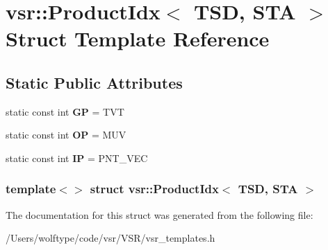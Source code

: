 \hypertarget{structvsr_1_1_product_idx_3_01_t_s_d_00_01_s_t_a_01_4}{\section{vsr\-:\-:Product\-Idx$<$ T\-S\-D, S\-T\-A $>$ Struct Template Reference}
\label{structvsr_1_1_product_idx_3_01_t_s_d_00_01_s_t_a_01_4}
}
\subsection*{Static Public Attributes}
\begin{DoxyCompactItemize}
\item 
\hypertarget{structvsr_1_1_product_idx_3_01_t_s_d_00_01_s_t_a_01_4_aebe5e7fd170de349619a1177c81133cb}{static const int {\bfseries G\-P} = T\-V\-T}\label{structvsr_1_1_product_idx_3_01_t_s_d_00_01_s_t_a_01_4_aebe5e7fd170de349619a1177c81133cb}

\item 
\hypertarget{structvsr_1_1_product_idx_3_01_t_s_d_00_01_s_t_a_01_4_ac8dee4caf30832a023a26c07c9be743d}{static const int {\bfseries O\-P} = M\-U\-V}\label{structvsr_1_1_product_idx_3_01_t_s_d_00_01_s_t_a_01_4_ac8dee4caf30832a023a26c07c9be743d}

\item 
\hypertarget{structvsr_1_1_product_idx_3_01_t_s_d_00_01_s_t_a_01_4_adedddecc04fb32e9e30484369d85e54f}{static const int {\bfseries I\-P} = P\-N\-T\-\_\-\-V\-E\-C}\label{structvsr_1_1_product_idx_3_01_t_s_d_00_01_s_t_a_01_4_adedddecc04fb32e9e30484369d85e54f}

\end{DoxyCompactItemize}
\subsubsection*{template$<$$>$ struct vsr\-::\-Product\-Idx$<$ T\-S\-D, S\-T\-A $>$}



The documentation for this struct was generated from the following file\-:\begin{DoxyCompactItemize}
\item 
/\-Users/wolftype/code/vsr/\-V\-S\-R/vsr\-\_\-templates.\-h\end{DoxyCompactItemize}
